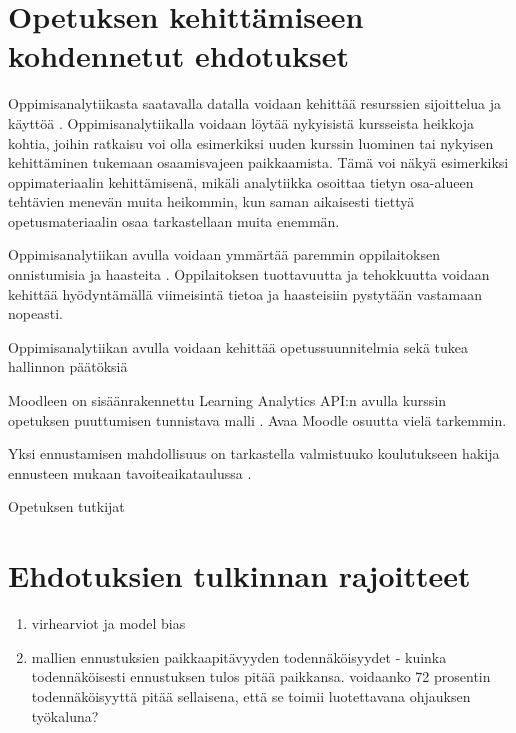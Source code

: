 \section{Opetuksen kehittämiseen kohdennetut ehdotukset}

\color{blue}
Oppimisanalytiikasta saatavalla datalla voidaan kehittää resurssien sijoittelua ja käyttöä \citep{longPenetratingFogAnalytics2011}. Oppimisanalytiikalla voidaan löytää nykyisistä kursseista heikkoja kohtia, joihin ratkaisu voi olla esimerkiksi uuden kurssin luominen tai nykyisen kehittäminen tukemaan osaamisvajeen paikkaamista. Tämä voi näkyä esimerkiksi oppimateriaalin kehittämisenä, mikäli analytiikka osoittaa tietyn osa-alueen tehtävien menevän muita heikommin, kun saman aikaisesti tiettyä opetusmateriaalin osaa tarkastellaan muita enemmän.

Oppimisanalytiikan avulla voidaan ymmärtää paremmin oppilaitoksen onnistumisia ja haasteita \citep{longPenetratingFogAnalytics2011}. Oppilaitoksen tuottavuutta ja tehokkuutta voidaan kehittää hyödyntämällä viimeisintä tietoa ja haasteisiin pystytään vastamaan nopeasti.

Oppimisanalytiikan avulla voidaan kehittää opetussuunnitelmia sekä tukea hallinnon päätöksiä \citep{romeroEducationalDataMining2010,longPenetratingFogAnalytics2011}

Moodleen on sisäänrakennettu Learning Analytics API:n avulla kurssin opetuksen puuttumisen tunnistava malli \citep{monllaoAnalyticsAPIMoodleDocs2021}. \color{red} Avaa Moodle osuutta vielä tarkemmin. \color{black}

Yksi ennustamisen mahdollisuus on tarkastella valmistuuko koulutukseen hakija ennusteen mukaan tavoiteaikataulussa \citep{barberCourseCorrectionUsing2012a}.

Opetuksen tutkijat \citep{romeroEducationalDataMining2010}

\color{black}

\color{red}
\section{Ehdotuksien tulkinnan rajoitteet}

\begin{enumerate}
    \item virhearviot ja model bias
    \item mallien ennustuksien paikkaapitävyyden todennäköisyydet - kuinka todennäköisesti ennustuksen tulos pitää paikkansa. voidaanko 72 prosentin todennäköisyyttä pitää sellaisena, että se toimii luotettavana ohjauksen työkaluna?
\end{enumerate}